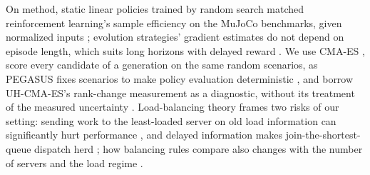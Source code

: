 On method, static linear policies trained by random search matched reinforcement learning's
sample efficiency on the MuJoCo benchmarks, given normalized inputs \citep{mania2018ars};
evolution strategies' gradient estimates do not depend on episode length, which suits long
horizons with delayed reward \citep{salimans2017es}. We use CMA-ES \citep{hansen2016tutorial},
score every candidate of a generation on the same random scenarios, as PEGASUS fixes scenarios to
make policy evaluation deterministic \citep{ng2000pegasus}, and borrow UH-CMA-ES's rank-change
measurement as a diagnostic, without its treatment of the measured uncertainty
\citep{hansen2009uh}.
Load-balancing theory frames two risks of our setting: sending work to the least-loaded server
on old load information can significantly hurt performance \citep{mitzenmacher1998old}, and
delayed information makes join-the-shortest-queue dispatch herd \citep{tahir2022meanfield}; how balancing rules compare
also changes with the number of servers and the load regime \citep{vanderboor2022survey}.

